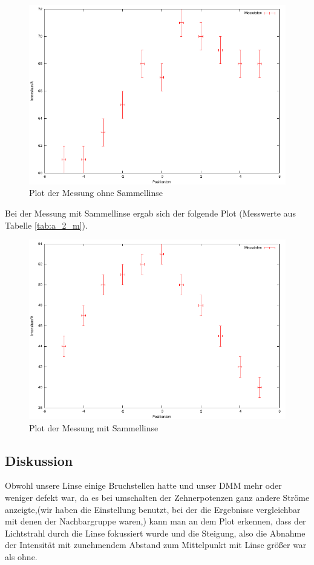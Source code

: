 \documentclass[12pt]{scrartcl}
\begin{document}
\begin{figure}[H]
\centering
    \includegraphics[scale = 1]{a_2_o.pdf}
  	\caption[Plot der Messung ohne Sammellinse]{Plot der Messung ohne Sammellinse}
  \label{fig:a_2_o}
\end{figure}

Bei der Messung mit Sammellinse ergab sich der folgende Plot (Messwerte aus Tabelle \ref{tab:a_2_m}).


\begin{figure}[H]
\centering
    \includegraphics[scale = 1]{a_2_m.pdf}
  	\caption[Plot der Messung mit Sammellinse]{Plot der Messung mit Sammellinse}
  \label{fig:a_2_m}
\end{figure}
\subsection{Diskussion}
Obwohl unsere Linse einige Bruchstellen hatte und unser DMM mehr oder weniger defekt war, da es bei umschalten der Zehnerpotenzen ganz andere Ströme anzeigte,(wir haben die Einstellung benutzt, bei der die Ergebnisse vergleichbar mit denen der Nachbargruppe waren,) kann man an dem Plot erkennen, dass der Lichtstrahl durch die Linse fokussiert wurde und die Steigung, also die Abnahme der Intensität mit zunehmendem Abstand zum Mittelpunkt mit Linse größer war als ohne.
\end{document}
